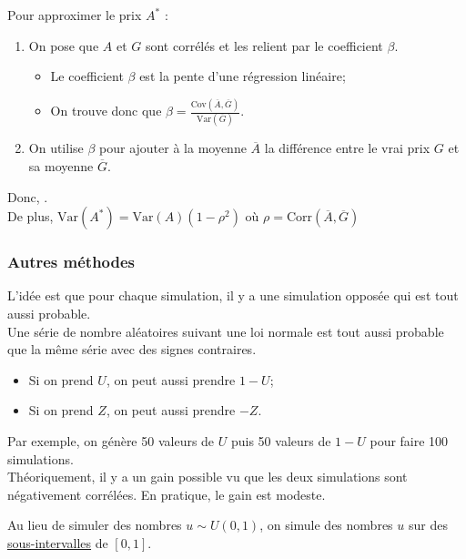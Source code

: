 \documentclass[10pt, french]{article}
\begin{document}
\begin{multicols*}{2}
Pour approximer le prix $A^{*}$ :
\begin{enumerate}
	\item	On pose que $A$ et $G$ sont corrélés et les relient par le coefficient $\beta$.
		\begin{itemize}
		\item	Le coefficient $\beta$ est la pente d'une régression linéaire;
		\item	On trouve donc que $\hat{\beta}	=	\frac{\text{Cov}(\overline{A}, \overline{G})}{\text{Var}(\overline{G})}$.
		\end{itemize}
	\item	On utilise $\beta$ pour ajouter à la moyenne $\overline{A}$ la différence entre le vrai prix $G$ et sa moyenne $\overline{G}$.
\end{enumerate}

Donc, .\\
De plus, $\text{Var}(A^{*})	=	\text{Var}(A)(1	-	\rho^{2})$ où $\rho	=	\text{Corr}(\overline{A}, \overline{G})$

\subsubsection*{Autres méthodes}
\begin{definitionNOHFILLsub}
L'idée est que pour chaque simulation, il y a une simulation opposée qui est tout aussi probable.\\

Une série de nombre aléatoires suivant une loi normale est tout aussi probable que la même série avec des signes contraires.
\begin{itemize}
	\item	Si on prend $U$, on peut aussi prendre $1 - U$;
	\item	Si on prend $Z$, on peut aussi prendre $-Z$.
\end{itemize}

Par exemple, on génère 50 valeurs de $U$ puis 50 valeurs de $1	-	U$ pour faire 100 simulations.
\\

Théoriquement, il y a un gain possible vu que les deux simulations sont négativement corrélées. En pratique, le gain est modeste.
\end{definitionNOHFILLsub}

\begin{definitionNOHFILLsub}
Au lieu de simuler des nombres $u \sim U(0, 1)$, on simule des nombres $u$ sur des \underline{sous-intervalles} de $[0, 1]$.\\


\end{definitionNOHFILLsub}
\end{multicols*}
\end{document}
